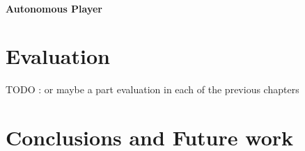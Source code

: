 \documentclass[12pt,twoside]{report}
\begin{document}




\subsubsection{Autonomous Player}


\chapter{Evaluation}

TODO : or maybe a part evaluation in each of the previous chapters

\chapter{Conclusions and Future work}
\end{document}
